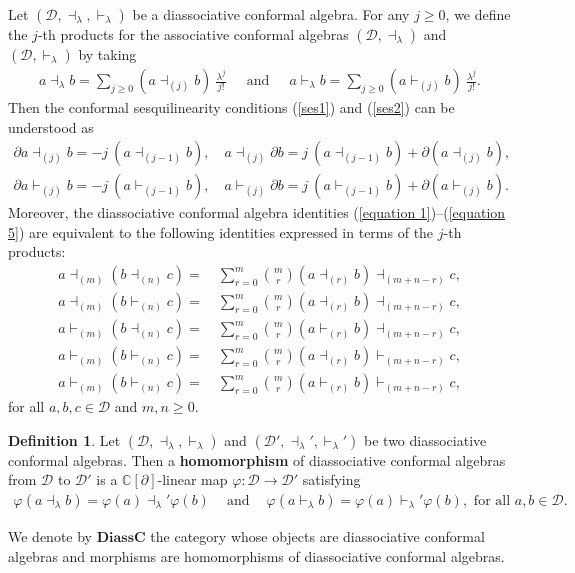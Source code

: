 \documentclass[a4paper,reqno,10pt]{amsart}
\theoremstyle{plain}
\theoremstyle{definition}
\newtheorem{definition}[thm]{Definition}
\theoremstyle{remark}
\newcommand{\C}{\mathbb{C}}
\newcommand{\D}{\mathcal{D}}
\newcommand{\p}{\partial}
\newcommand{\la}{\lambda}
\begin{document}
Let $(\D,\dashv_{\la},\vdash_{\la})$ be a diassociative conformal algebra. For any $j \geq 0$, we define the $j$-th products for the associative conformal algebras $(\D, \dashv_{\la})$ and $(\D, \vdash_{\la})$ by taking  
\begin{align} \label{j}
    a \dashv_{\la} b = \sum_{j  \geq 0} ( a \dashv_{(j)} b ) ~  \! \frac{\la^j}{j!} ~~~~~ \text{ and } ~~~~~  a \vdash_{\la}b = \sum_{j \geq 0} ( a\vdash_{(j)}b ) ~ \! \frac{\la^j}{j!}.
\end{align}
Then the conformal sesquilinearity conditions (\ref{ses1}) and (\ref{ses2}) can be understood as
\begin{align*}
    \partial a \dashv_{(j)} b = - j ~ \! (a \dashv_{(j-1)} b), \quad a \dashv_{(j)} \partial b = j ~ \! ( a \dashv_{(j-1)} b) + \partial (a \dashv_{(j)} b),\\
     \partial a \vdash_{(j)} b = - j ~ \! (a \vdash_{(j-1)} b), \quad a \vdash_{(j)} \partial b = j ~ \! ( a \vdash_{(j-1)} b) + \partial (a \vdash_{(j)} b).
\end{align*}
Moreover, the diassociative conformal algebra identities (\ref{equation 1})--(\ref{equation 5}) are equivalent to the following identities expressed in terms of the $j$-th products:
\begin{align}
  a\dashv_{(m)}(b \dashv_{(n)}c) =~& \sum_{r = 0}^{m} \binom{m}{r}(a\dashv_{(r)}b) \dashv_{(m+n-r)}c,\label{equation 6}\\
 a \dashv_{(m)}(b \vdash_{(n)}c) =~& \sum_{r = 0}^{m} \binom{m}{r}(a\dashv_{(r)}b) \dashv_{(m+n-r)}c,\label{equation 7}\\
 a\vdash_{(m)}(b \dashv_{(n)}c) = ~&  \sum_{r = 0}^{m} \binom{m}{r}(a\vdash_{(r)}b)\dashv_{(m+n-r)}c,\label{equation 8}\\
 a \vdash_{(m)}(b\vdash_{(n)}c)=~&\sum_{r = 0}^{m} \binom{m}{r} (a\dashv_{(r)}b)\vdash_{(m+n-r)}c,\label{equation 9}\\
 a \vdash_{(m)}(b\vdash_{(n)}c)=~&\sum_{r = 0}^{m} \binom{m}{r} (a\vdash_{(r)}b)\vdash_{(m+n-r)}c,\label{equation 10}
\end{align}
for all $a,b,c\in\D$ and $m,n\geq 0$.

\begin{definition}
Let $(\D,\dashv_{\la},\vdash_{\la})$ and
$(\D',\dashv_{\la}',\vdash_{\la}')$ be two diassociative conformal algebras. Then a {\bf homomorphism} of diassociative conformal algebras
from $\D$ to
$\D'$
is a $\C[\p]$-linear map
$\varphi:\D\rightarrow\D'$ satisfying
\begin{align*}
\varphi(a\dashv_{\la}b)
=\varphi(a)\dashv_{\la}'\varphi(b) ~~~~ \text{ and } ~~~~
\varphi(a\vdash_{\la}b)
=\varphi(a)\vdash_{\la}'\varphi(b), \text{ for all } a, b \in \D.
\end{align*}
\end{definition}
\noindent We denote by $\mathbf{DiassC}$ the category whose objects are diassociative conformal algebras and morphisms are homomorphisms of diassociative conformal algebras.
\end{document}
